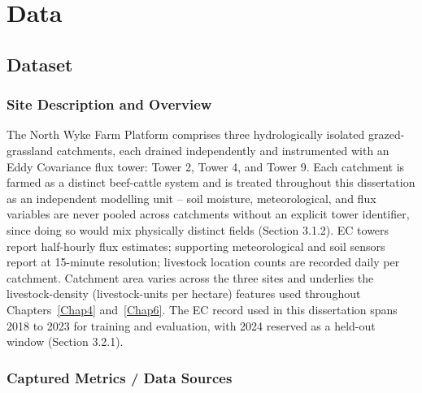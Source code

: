 \chapter{Data} \label{Chap3}

\section{Dataset}

\subsection{Site Description and Overview}

The North Wyke Farm Platform comprises three hydrologically isolated grazed-grassland catchments,
each drained independently and instrumented with an Eddy Covariance flux tower: Tower 2, Tower 4,
and Tower 9. Each catchment is farmed as a distinct beef-cattle system and is treated throughout
this dissertation as an independent modelling unit -- soil moisture, meteorological, and flux
variables are never pooled across catchments without an explicit tower identifier, since doing so
would mix physically distinct fields (Section 3.1.2). EC towers report half-hourly flux estimates;
supporting meteorological and soil sensors report at 15-minute resolution; livestock location
counts are recorded daily per catchment. Catchment area varies across the three sites and underlies
the livestock-density (livestock-units per hectare) features used throughout Chapters~\ref{Chap4}
and~\ref{Chap6}. The EC record used in this dissertation spans 2018 to 2023 for training and
evaluation, with 2024 reserved as a held-out window (Section 3.2.1).

\subsection{Captured Metrics / Data Sources}

